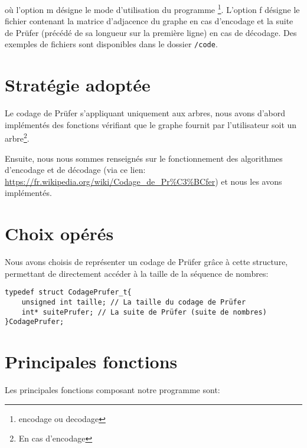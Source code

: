 \documentclass[a4paper, 11pt, oneside]{article}
\begin{document}
où l'option m désigne le mode d'utilisation du programme \footnote{encodage ou decodage}. L'option f désigne le fichier contenant la matrice d'adjacence du graphe en cas d'encodage et la suite de Prüfer (précédé de sa longueur sur la première ligne) en cas de décodage. Des exemples de fichiers sont disponibles dans le dossier \texttt{/code}.

\section{Stratégie adoptée}

Le codage de Prüfer s'appliquant uniquement aux arbres, nous avons d'abord implémentés des fonctions vérifiant que le graphe fournit par l'utilisateur soit un arbre\footnote{En cas d'encodage}.

Ensuite, nous nous sommes renseignés sur le fonctionnement des algorithmes d'encodage et de décodage (via ce lien: \url{https://fr.wikipedia.org/wiki/Codage_de_Pr%C3%BCfer}) et nous les avons implémentés.

\newpage

\section{Choix opérés}

Nous avons choisis de représenter un codage de Prüfer grâce à cette structure, permettant de directement accéder à la taille de la séquence de nombres: 

\begin{lstlisting}
typedef struct CodagePrufer_t{
	unsigned int taille; // La taille du codage de Prüfer
	int* suitePrufer; // La suite de Prüfer (suite de nombres)
}CodagePrufer;
\end{lstlisting}

\section{Principales fonctions}

Les principales fonctions composant notre programme sont:\\
\end{document}
